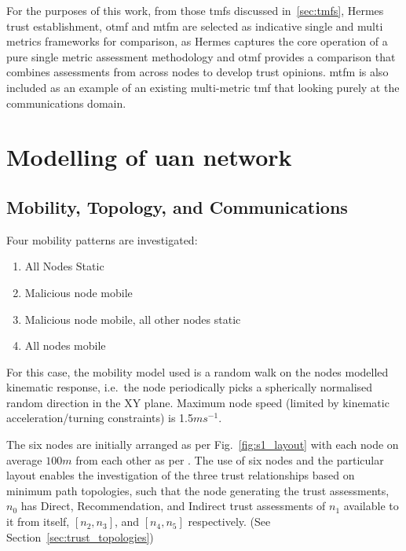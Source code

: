 For the purposes of this work, from those \glspl{tmf} discussed in~\autoref{sec:tmfs}, Hermes trust establishment, \gls{otmf} and \gls{mtfm} are selected as indicative single and multi metrics frameworks for comparison, as Hermes captures the core operation of a pure single metric assessment methodology and \gls{otmf} provides a comparison that combines assessments from across nodes to develop trust opinions.
\gls{mtfm} is also included as an example of an existing multi-metric \gls{tmf} that looking purely at the communications domain.


\section{Modelling of \gls{uan} network}\label{sec:initialsystemcharacterization}

\subsection{Mobility, Topology, and Communications}

Four mobility patterns are investigated:
\begin{enumerate}
	\item All Nodes Static
	\item Malicious node mobile
	\item Malicious node mobile, all other nodes static
	\item All nodes mobile
\end{enumerate}

For this case, the mobility model used is a random walk on the nodes modelled kinematic response, i.e.\ the node periodically picks a spherically normalised random direction in the XY plane.
Maximum node speed (limited by kinematic acceleration/turning constraints) is 1.5$ms^{-1}$\cite{Milgram2001}.

The six nodes are initially arranged as per Fig.~\ref{fig:s1_layout} with each node on average $100m$ from each other as per \cite{Guo11}.
The use of six nodes and the particular layout enables the investigation of the three trust relationships based on minimum path topologies, such that the node generating the trust assessments, $n_0$ has Direct, Recommendation, and Indirect trust assessments of $n_1$ available to it from itself, $[n_2,n_3]$, and $[n_4,n_5]$ respectively. 
(See Section~\ref{sec:trust_topologies})

